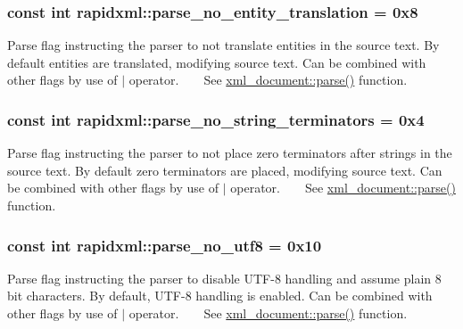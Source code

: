 \subsubsection[{parse\+\_\+no\+\_\+entity\+\_\+translation}]{\setlength{\rightskip}{0pt plus 5cm}const int rapidxml\+::parse\+\_\+no\+\_\+entity\+\_\+translation = 0x8}\label{namespacerapidxml_a89113c103ffaf77615d1aa330c8dcca8}
Parse flag instructing the parser to not translate entities in the source text. By default entities are translated, modifying source text. Can be combined with other flags by use of $\vert$ operator. ~\newline
~\newline
 See \hyperlink{classrapidxml_1_1xml__document_ac6e73ff9ac323bf5a370c38feb03a6b1}{xml\+\_\+document\+::parse()} function. \hypertarget{namespacerapidxml_af3fc88ba6bee33482a2db81b1da36ea1}{}
\subsubsection[{parse\+\_\+no\+\_\+string\+\_\+terminators}]{\setlength{\rightskip}{0pt plus 5cm}const int rapidxml\+::parse\+\_\+no\+\_\+string\+\_\+terminators = 0x4}\label{namespacerapidxml_af3fc88ba6bee33482a2db81b1da36ea1}
Parse flag instructing the parser to not place zero terminators after strings in the source text. By default zero terminators are placed, modifying source text. Can be combined with other flags by use of $\vert$ operator. ~\newline
~\newline
 See \hyperlink{classrapidxml_1_1xml__document_ac6e73ff9ac323bf5a370c38feb03a6b1}{xml\+\_\+document\+::parse()} function. \hypertarget{namespacerapidxml_a22d4aefaceb00d7afabfef7107b108da}{}
\subsubsection[{parse\+\_\+no\+\_\+utf8}]{\setlength{\rightskip}{0pt plus 5cm}const int rapidxml\+::parse\+\_\+no\+\_\+utf8 = 0x10}\label{namespacerapidxml_a22d4aefaceb00d7afabfef7107b108da}
Parse flag instructing the parser to disable U\+T\+F-\/8 handling and assume plain 8 bit characters. By default, U\+T\+F-\/8 handling is enabled. Can be combined with other flags by use of $\vert$ operator. ~\newline
~\newline
 See \hyperlink{classrapidxml_1_1xml__document_ac6e73ff9ac323bf5a370c38feb03a6b1}{xml\+\_\+document\+::parse()} function. \hypertarget{namespacerapidxml_a45d4d8fef551beaaba23a83b847fd6a3}{}
